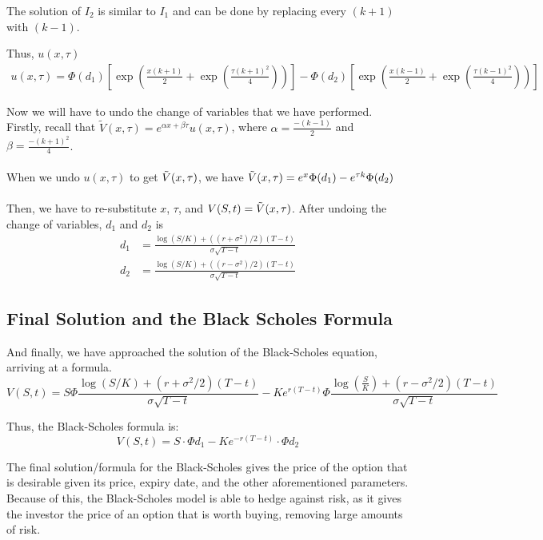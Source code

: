 \documentclass{article}
\begin{document}
The solution of $I_2$ is similar to $I_1$ and can be done by replacing every $(k+1)$ with $(k-1)$.

Thus, $u(x, \tau)$
\begin{align*}
    u(x, \tau) = \Phi(d_1) \left[\exp(\frac{x(k+1)}{2} + \exp(\frac{\tau(k+1)^2}{4})) \right] - \Phi(d_2) \left[\exp(\frac{x(k-1)}{2} + \exp(\frac{\tau(k-1)^2}{4})) \right]
\end{align*}

Now we will have to undo the change of variables that we have performed. Firstly, recall that $\tilde{V}(x, \tau) = e^{\alpha x + \beta \tau} u(x,\tau)$, where $\alpha =  \frac{-(k-1)}{2}$ and $\beta = \frac{-(k+1)^2}{4}$. 
\\ \\
When we undo $u(x, \tau)$ to get $\tilde{V}(x,\tau)$, we have $\tilde{V}(x,\tau) = e^x \Phi(d_1) - e^{\tau k}\Phi(d_2)$  
\\
\\
Then, we have to re-substitute $x$, $\tau$, and $V(S,t) = \tilde{V}(x,\tau)$. After undoing the change of variables, $d_1$ and $d_2$ is
\begin{align*}
    d_1 &= \frac{\log(S/K) + ((r + \sigma^2)/2)(T-t)}{\sigma \sqrt{T-t}} \\
    d_2&=  \frac{\log(S/K) + ((r - \sigma^2)/2)(T-t)}{\sigma \sqrt{T-t}}
\end{align*}

\subsection*{Final Solution and the Black Scholes Formula}


And finally, we have approached the solution of the Black-Scholes equation, arriving at a formula. 
\begin{equation}
    V(S,t) = S\Phi \frac{\log{(S/K)} + (r + \sigma^2/2)(T-t)}{\sigma \sqrt{T-t}}
    - Ke^{r(T-t)} \Phi \frac{\log{(\frac{S}{K})} + (r-\sigma^{2}/2)(T-t)}{\sigma \sqrt{T-t}}
\end{equation}


Thus, the Black-Scholes formula is:
\begin{equation}
    V(S,t) = S \cdot \Phi d_1 - Ke^{-r(T-t)} \cdot \Phi d_2
\end{equation}

The final solution/formula for the Black-Scholes gives the price of the option that is desirable given 
its price, expiry date, and the other aforementioned parameters. Because of this, the Black-Scholes model is able to hedge against risk,
as it gives the investor the price of an option that is worth buying, removing large amounts of risk. 
\end{document}
